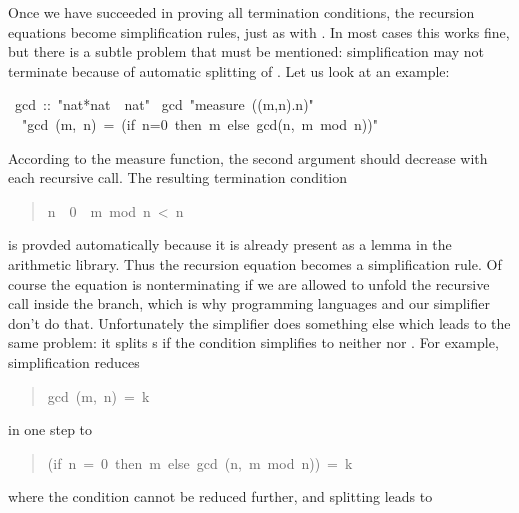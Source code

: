 \begin{isabelle}%
%
\begin{isamarkuptext}%
Once we have succeeded in proving all termination conditions, the recursion
equations become simplification rules, just as with
. In most cases this works fine, but there is a subtle
problem that must be mentioned: simplification may not
terminate because of automatic splitting of .
Let us look at an example:%
\end{isamarkuptext}%
\ gcd\ ::\ {"}nat*nat\ {\isasymRightarrow}\ nat{"}\isanewline
{}\ gcd\ {"}measure\ ({\isasymlambda}(m,n).n){"}\isanewline
\ \ {"}gcd\ (m,\ n)\ =\ (if\ n=0\ then\ m\ else\ gcd(n,\ m\ mod\ n)){"}%
\begin{isamarkuptext}%
\noindent
According to the measure function, the second argument should decrease with
each recursive call. The resulting termination condition
\begin{quote}

\begin{isabelle}%
n\ {\isasymnoteq}\ 0\ {\isasymLongrightarrow}\ m\ mod\ n\ <\ n
\end{isabelle}%

\end{quote}
is provded automatically because it is already present as a lemma in the
arithmetic library. Thus the recursion equation becomes a simplification
rule. Of course the equation is nonterminating if we are allowed to unfold
the recursive call inside the  branch, which is why programming
languages and our simplifier don't do that. Unfortunately the simplifier does
something else which leads to the same problem: it splits s if the
condition simplifies to neither  nor . For
example, simplification reduces
\begin{quote}

\begin{isabelle}%
gcd\ (m,\ n)\ =\ k
\end{isabelle}%

\end{quote}
in one step to
\begin{quote}

\begin{isabelle}%
(if\ n\ =\ 0\ then\ m\ else\ gcd\ (n,\ m\ mod\ n))\ =\ k
\end{isabelle}%

\end{quote}
where the condition cannot be reduced further, and splitting leads to
\begin{quote}


\end{quote}
\end{isamarkuptext}
\end{isabelle}
